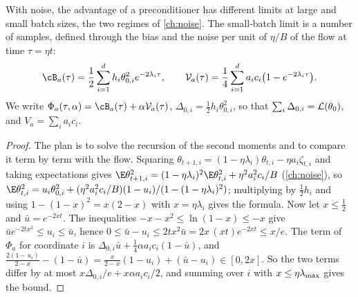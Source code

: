 \begin{refsection}
With noise, the advantage of a preconditioner has different limits at large and small batch sizes, the two regimes of \cref{ch:noise}. The small-batch limit is a number of samples, defined through the bias and the noise per unit of $\eta/B$ of the flow at time $\tau=\eta t$:
\begin{equation}\label{eq:transformers:BV}
  \cB_a(\tau)=\frac12\sum_{i=1}^dh_i\theta_{0,i}^2e^{-2\lambda_i\tau},\qquad \cV_a(\tau)=\frac14\sum_{i=1}^da_ic_i\bigl(1-e^{-2\lambda_i\tau}\bigr).
\end{equation}
We write $\Phi_a(\tau,\alpha)=\cB_a(\tau)+\alpha\cV_a(\tau)$, $\Delta_{0,i}=\frac12h_i\theta_{0,i}^2$, so that $\sum_i\Delta_{0,i}=\mathcal{L}(\theta_0)$, and $V_a=\sum_ia_ic_i$.


\begin{proof}
The plan is to solve the recursion of the second moments and to compare it term by term with the flow. Squaring $\theta_{t+1,i}=(1-\eta\lambda_i)\theta_{t,i}-\eta a_i\zeta_{t,i}$ and taking expectations gives $\E\theta_{t+1,i}^2=(1-\eta\lambda_i)^2\E\theta_{t,i}^2+\eta^2a_i^2c_i/B$ (\cref{ch:noise}), so $\E\theta_{t,i}^2=u_i\theta_{0,i}^2+(\eta^2a_i^2c_i/B)(1-u_i)/(1-(1-\eta\lambda_i)^2)$; multiplying by $\frac12h_i$ and using $1-(1-x)^2=x(2-x)$ with $x=\eta\lambda_i$ gives the formula. Now let $x\le\frac12$ and $\bar u=e^{-2xt}$. The inequalities $-x-x^2\le\ln(1-x)\le-x$ give $\bar ue^{-2tx^2}\le u_i\le\bar u$, hence $0\le\bar u-u_i\le2tx^2\bar u=2x\,(xt)e^{-2xt}\le x/e$. The term of $\Phi_a$ for coordinate $i$ is $\Delta_{0,i}\bar u+\frac14\alpha a_ic_i(1-\bar u)$, and $\frac{2(1-u_i)}{2-x}-(1-\bar u)=\frac x{2-x}(1-u_i)+(\bar u-u_i)\in[0,2x]$. So the two terms differ by at most $x\Delta_{0,i}/e+x\alpha a_ic_i/2$, and summing over $i$ with $x\le\eta\lambda_{\max}$ gives the bound.
\end{proof}


\end{refsection}
